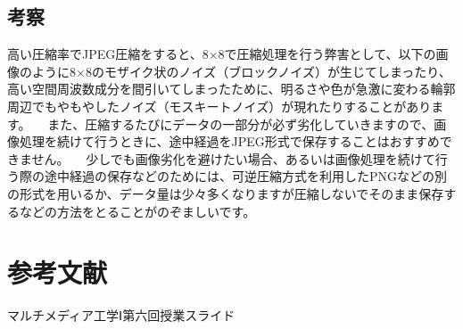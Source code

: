 \documentclass[a4paper,11pt]{bxjsarticle}
\begin{document}
  \subsection{考察}
  高い圧縮率でJPEG圧縮をすると、8×8で圧縮処理を行う弊害として、以下の画像のように8×8のモザイク状のノイズ（ブロックノイズ）が生じてしまったり、高い空間周波数成分を間引いてしまったために、明るさや色が急激に変わる輪郭周辺でもやもやしたノイズ（モスキートノイズ）が現れたりすることがあります。
  　また、圧縮するたびにデータの一部分が必ず劣化していきますので、画像処理を続けて行うときに、途中経過をJPEG形式で保存することはおすすめできません。
  　少しでも画像劣化を避けたい場合、あるいは画像処理を続けて行う際の途中経過の保存などのためには、可逆圧縮方式を利用したPNGなどの別の形式を用いるか、データ量は少々多くなりますが圧縮しないでそのまま保存するなどの方法をとることがのぞましいです。


\section{参考文献}
マルチメディア工学Ⅰ第六回授業スライド \\
\end{document}
